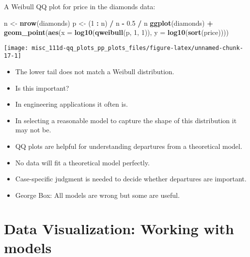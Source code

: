 \documentclass[]{book}
\newenvironment{Shaded}{\begin{snugshade}}{\end{snugshade}}
\newcommand{\DataTypeTok}[1]{\textcolor[rgb]{0.13,0.29,0.53}{#1}}
\newcommand{\DecValTok}[1]{\textcolor[rgb]{0.00,0.00,0.81}{#1}}
\newcommand{\FloatTok}[1]{\textcolor[rgb]{0.00,0.00,0.81}{#1}}
\newcommand{\KeywordTok}[1]{\textcolor[rgb]{0.13,0.29,0.53}{\textbf{#1}}}
\newcommand{\NormalTok}[1]{#1}
\newcommand{\OperatorTok}[1]{\textcolor[rgb]{0.81,0.36,0.00}{\textbf{#1}}}
\newcommand{\StringTok}[1]{\textcolor[rgb]{0.31,0.60,0.02}{#1}}
\begin{document}
A Weibull QQ plot for price in the diamonds data:

\begin{Shaded}
\begin{Highlighting}[]
\NormalTok{n <-}\StringTok{ }\KeywordTok{nrow}\NormalTok{(diamonds)}
\NormalTok{p <-}\StringTok{ }\NormalTok{(}\DecValTok{1} \OperatorTok{:}\StringTok{ }\NormalTok{n) }\OperatorTok{/}\StringTok{ }\NormalTok{n }\OperatorTok{-}\StringTok{ }\FloatTok{0.5} \OperatorTok{/}\StringTok{ }\NormalTok{n}
\KeywordTok{ggplot}\NormalTok{(diamonds) }\OperatorTok{+}
\StringTok{    }\KeywordTok{geom_point}\NormalTok{(}\KeywordTok{aes}\NormalTok{(}\DataTypeTok{x =} \KeywordTok{log10}\NormalTok{(}\KeywordTok{qweibull}\NormalTok{(p, }\DecValTok{1}\NormalTok{, }\DecValTok{1}\NormalTok{)), }\DataTypeTok{y =} \KeywordTok{log10}\NormalTok{(}\KeywordTok{sort}\NormalTok{(price))))}
\end{Highlighting}
\end{Shaded}

\begin{center}\texttt{[image: misc\_111d-qq\_plots\_pp\_plots\_files/figure-latex/unnamed-chunk-17-1]} \end{center}

\begin{itemize}
\item
  The lower tail does not match a Weibull distribution.
\item
  Is this important?
\item
  In engineering applications it often is.
\item
  In selecting a reasonable model to capture the shape of this distribution it may not be.
\item
  QQ plots are helpful for understanding departures from a theoretical model.
\item
  No data will fit a theoretical model perfectly.
\item
  Case-specific judgment is needed to decide whether departures are important.
\item
  George Box: All models are wrong but some are useful.
\end{itemize}

\hypertarget{data-visualization-working-with-models}{%
\chapter{Data Visualization: Working with models}\label{data-visualization-working-with-models}}
\end{document}
